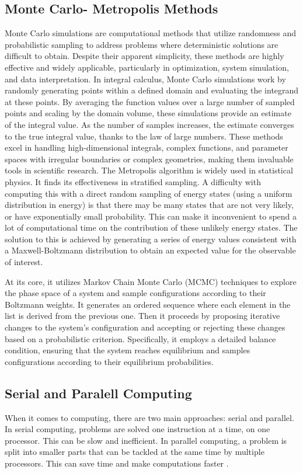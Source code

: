 \documentclass[%
 reprint,
 amsmath,amssymb,
 aps,
]{revtex4-2}
\begin{document}
\subsection{Monte Carlo- Metropolis Methods}
Monte Carlo simulations are computational methods that utilize randomness and probabilistic sampling to address problems where deterministic solutions are difficult to obtain. Despite their apparent simplicity, these methods are highly effective and widely applicable, particularly in optimization, system simulation, and data interpretation. In integral calculus, Monte Carlo simulations work by randomly generating points within a defined domain and evaluating the integrand at these points. By averaging the function values over a large number of sampled points and scaling by the domain volume, these simulations provide an estimate of the integral value. As the number of samples increases, the estimate converges to the true integral value, thanks to the law of large numbers. These methods excel in handling high-dimensional integrals, complex functions, and parameter spaces with irregular boundaries or complex geometries, making them invaluable tools in scientific research.
The Metropolis algorithm is widely used in statistical physics. It finds its effectiveness in stratified sampling. A difficulty with computing this with a direct random sampling of energy states (using a uniform distribution in energy) is that there may be many states that are not very likely, or have exponentially small probability.
 This can make it inconvenient to spend a lot of computational time on the contribution of these unlikely energy states.
The solution to this is achieved by generating a series of energy values consistent with a Maxwell-Boltzmann distribution to obtain an expected value for the observable of interest. \par
At its core, it utilizes Markov Chain Monte Carlo (MCMC) techniques to explore the phase space of a system and sample configurations according to their Boltzmann weights.
It generates an ordered sequence where each element in the list is derived from the previous one. Then it proceeds by proposing iterative changes to the system's configuration and accepting or rejecting these changes based on a probabilistic criterion. Specifically, it employs a detailed balance condition, ensuring that the system reaches equilibrium and samples configurations according to their equilibrium probabilities.


\subsection{Serial and Paralell Computing}
When it comes to computing, there are two main approaches: serial and parallel. In serial computing, problems are solved one instruction at a time, on one processor. This can be slow and inefficient. In parallel computing, a problem is split into smaller parts that can be tackled at the same time by multiple processors. This can save time and make computations faster \cite{rastogi_significance_nodate}. 
\end{document}
